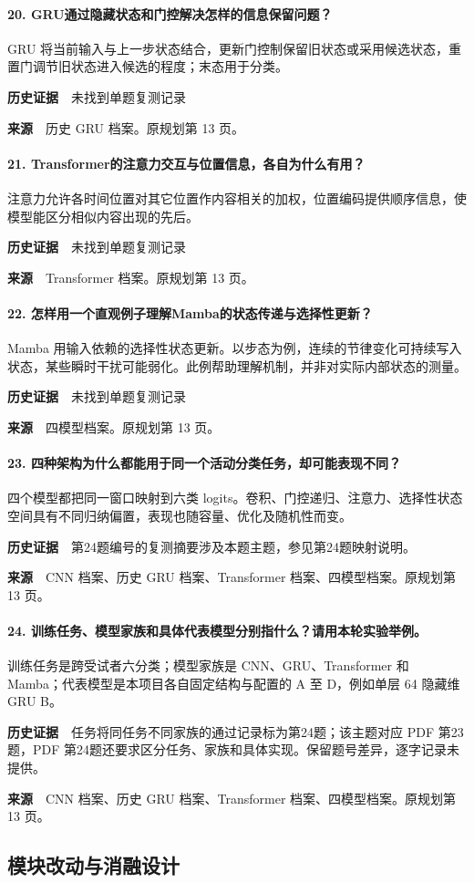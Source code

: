\paragraph{20. GRU通过隐藏状态和门控解决怎样的信息保留问题？}
GRU 将当前输入与上一步状态结合，更新门控制保留旧状态或采用候选状态，重置门调节旧状态进入候选的程度；末态用于分类。\par
\textbf{历史证据}　未找到单题复测记录\par
\textbf{来源}　历史 GRU 档案。原规划第 13 页。\par
\paragraph{21. Transformer的注意力交互与位置信息，各自为什么有用？}
注意力允许各时间位置对其它位置作内容相关的加权，位置编码提供顺序信息，使模型能区分相似内容出现的先后。\par
\textbf{历史证据}　未找到单题复测记录\par
\textbf{来源}　Transformer 档案。原规划第 13 页。\par
\paragraph{22. 怎样用一个直观例子理解Mamba的状态传递与选择性更新？}
Mamba 用输入依赖的选择性状态更新。以步态为例，连续的节律变化可持续写入状态，某些瞬时干扰可能弱化。此例帮助理解机制，并非对实际内部状态的测量。\par
\textbf{历史证据}　未找到单题复测记录\par
\textbf{来源}　四模型档案。原规划第 13 页。\par
\paragraph{23. 四种架构为什么都能用于同一个活动分类任务，却可能表现不同？}
四个模型都把同一窗口映射到六类 logits。卷积、门控递归、注意力、选择性状态空间具有不同归纳偏置，表现也随容量、优化及随机性而变。\par
\textbf{历史证据}　第24题编号的复测摘要涉及本题主题，参见第24题映射说明。\par
\textbf{来源}　CNN 档案、历史 GRU 档案、Transformer 档案、四模型档案。原规划第 13 页。\par
\paragraph{24. 训练任务、模型家族和具体代表模型分别指什么？请用本轮实验举例。}
训练任务是跨受试者六分类；模型家族是 CNN、GRU、Transformer 和 Mamba；代表模型是本项目各自固定结构与配置的 A 至 D，例如单层 64 隐藏维 GRU B。\par
\textbf{历史证据}　任务将同任务不同家族的通过记录标为第24题；该主题对应 PDF 第23题，PDF 第24题还要求区分任务、家族和具体实现。保留题号差异，逐字记录未提供。\par
\textbf{来源}　CNN 档案、历史 GRU 档案、Transformer 档案、四模型档案。原规划第 13 页。\par
\clearpage\subsection{模块改动与消融设计}

